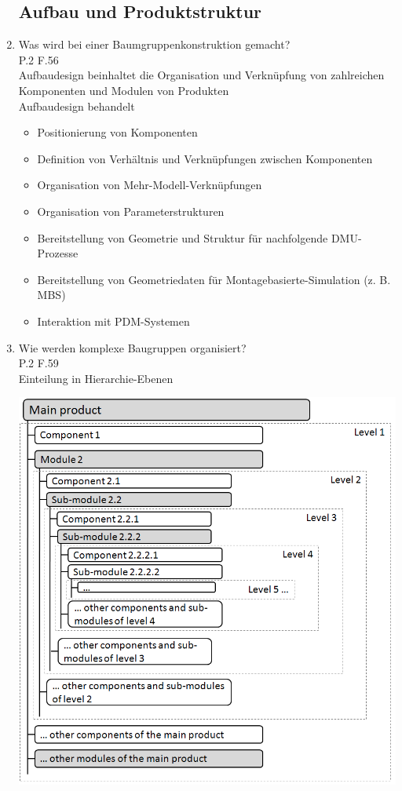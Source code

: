 \documentclass[10pt,a4paper,fleqn]{article}
\begin{document}
\begin{enumerate}
\subsection{Aufbau und Produktstruktur}
	\item Was wird bei einer Baumgruppenkonstruktion gemacht?\\
		P.2 F.56\\
		Aufbaudesign beinhaltet die Organisation und Verknüpfung von zahlreichen Komponenten und Modulen von Produkten\\
		Aufbaudesign behandelt \vspace{-0.3cm}
			\begin{itemize}
				\item Positionierung von Komponenten
				\item Definition von Verhältnis und Verknüpfungen zwischen Komponenten
				\item Organisation von Mehr-Modell-Verknüpfungen
				\item Organisation von Parameterstrukturen
				\item Bereitstellung von Geometrie und Struktur für nachfolgende DMU-Prozesse
				\item Bereitstellung von Geometriedaten für Montagebasierte-Simulation (z. B. MBS)
				\item Interaktion mit PDM-Systemen
			\end{itemize}
	\item Wie werden komplexe Baugruppen organisiert? \\
		P.2 F.59\\
		Einteilung in Hierarchie-Ebenen\\
		\begin{center}
			\includegraphics[scale=0.3]{hirarchie.png}

\end{center}
\end{enumerate}
\end{document}

